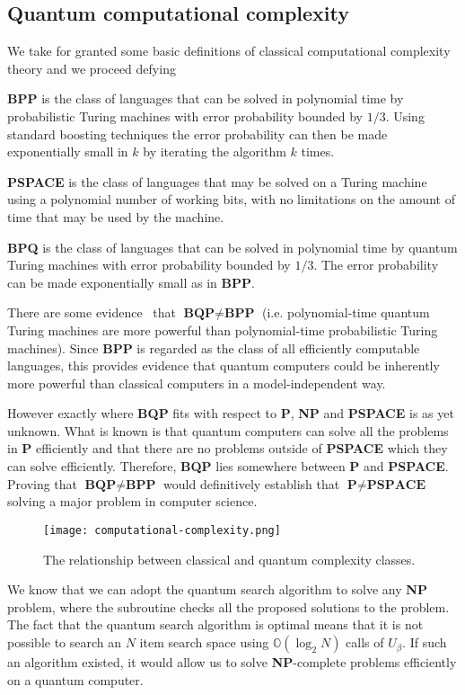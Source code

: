 \subsection{Quantum computational complexity}
We take for granted some basic definitions of classical computational complexity theory and we proceed defying
\begin{defn}
\textbf{BPP} is the class of languages that can be solved in polynomial time by probabilistic Turing machines with error probability bounded by $1/3$. Using standard boosting techniques the error probability can then be made exponentially small in $k$ by iterating the algorithm $k$ times.
\end{defn}
\begin{defn}
\textbf{PSPACE} is the class of languages that may be solved on a Turing machine using a polynomial number of working bits, with no limitations on the amount of time that may be used by the machine.
\end{defn}
\begin{defn}
\textbf{BPQ} is the class of languages that can be solved in polynomial time by quantum Turing machines with error probability bounded by $1/3$. The error probability can be made exponentially small as in \textbf{BPP}.
\end{defn}
There are some evidence~\cite{Bennett_1997} that $\textbf{BQP} \neq \textbf{BPP}$ (i.e. polynomial-time quantum Turing machines are more powerful than polynomial-time probabilistic Turing machines). Since \textbf{BPP} is regarded as the class of all efficiently computable languages, this provides evidence that quantum computers could be inherently more powerful than classical computers in a model-independent way.

However exactly where \textbf{BQP} fits with respect to \textbf{P}, \textbf{NP} and \textbf{PSPACE} is as yet unknown. What is known is that quantum computers can solve all the problems in \textbf{P} efficiently and that there are no problems outside of \textbf{PSPACE} which they can solve efficiently. Therefore, \textbf{BQP} lies somewhere between \textbf{P} and \textbf{PSPACE}.
Proving that $\textbf{BQP} \neq \textbf{BPP}$ would definitively establish that $\textbf{P} \neq \textbf{PSPACE}$ solving a major problem in computer science.


\begin{figure}
\texttt{[image: computational-complexity.png]}
\centering
\caption{The relationship between classical and quantum complexity classes.}
\end{figure}
We know that we can adopt the quantum search algorithm to solve any \textbf{NP} problem, where the subroutine checks all the proposed solutions to the problem.
The fact that the quantum search algorithm is optimal means that it is not possible to search an $N$ item search space using $\mathbb{O}(\log_2{N})$ calls of $\hat{U}_\beta$. If such an algorithm existed, it would allow us to solve \textbf{NP}-complete problems efficiently on a quantum computer.

